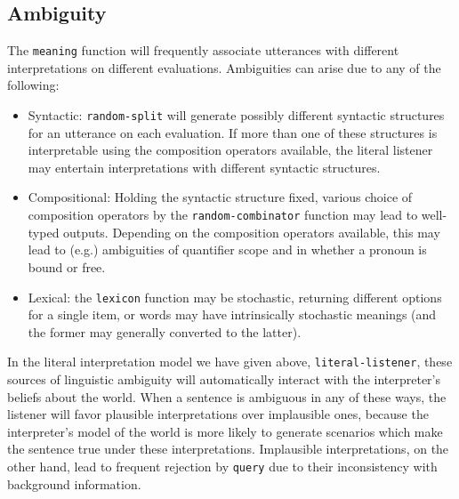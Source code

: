 \documentclass[pdfextras]{handbook}
\begin{document}
\subsection{\label{ambiguity}Ambiguity}
The \lstinline{meaning} function will frequently associate utterances with different interpretations on different evaluations. 
Ambiguities can arise due to any of the following:
\begin{itemize}
\item Syntactic: \lstinline{random-split} will generate possibly different syntactic structures for an utterance on each evaluation. 
If more than one of these structures is interpretable using the composition operators available, the literal listener may entertain interpretations with different syntactic structures.
\item Compositional: Holding the syntactic structure fixed, various choice of composition operators by the \lstinline{random-combinator} function may lead to well-typed outputs. 
Depending on the composition operators available, this may lead to (e.g.) ambiguities of quantifier scope and in whether a pronoun is bound or free.
\item Lexical: the \lstinline{lexicon} function may be stochastic, returning different options for a single item, or words may have intrinsically stochastic meanings (and the former may generally converted to the latter). 
\end{itemize}
In the literal interpretation model we have given above, \lstinline{literal-listener}, these sources of linguistic ambiguity will automatically interact with the interpreter's beliefs about the world.
 When a sentence is ambiguous in any of these ways, the listener will favor plausible interpretations over implausible ones, because the interpreter's model of the world is more likely to generate scenarios which make the sentence true under these interpretations. 
Implausible interpretations, on the other hand, lead to frequent rejection by \lstinline{query} due to their inconsistency with background information.
\end{document}
